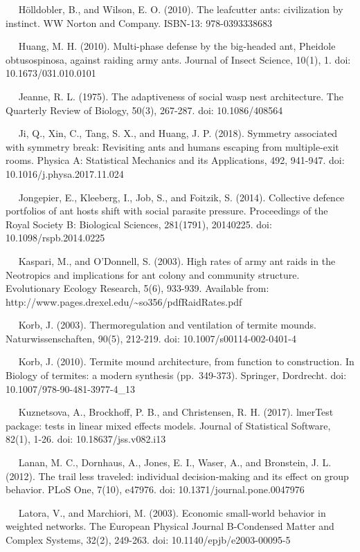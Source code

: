 \documentclass[3p]{elsarticle} %
\begin{document}
~~ Hölldobler, B., and Wilson, E. O. (2010). The leafcutter ants:
civilization by instinct. WW Norton and Company. ISBN-13: 978-0393338683

~~ Huang, M. H. (2010). Multi-phase defense by the big-headed ant,
Pheidole obtusospinosa, against raiding army ants. Journal of Insect
Science, 10(1), 1. doi: 10.1673/031.010.0101

~~ Jeanne, R. L. (1975). The adaptiveness of social wasp nest
architecture. The Quarterly Review of Biology, 50(3), 267-287. doi:
10.1086/408564

~~ Ji, Q., Xin, C., Tang, S. X., and Huang, J. P. (2018). Symmetry
associated with symmetry break: Revisiting ants and humans escaping from
multiple-exit rooms. Physica A: Statistical Mechanics and its
Applications, 492, 941-947. doi: 10.1016/j.physa.2017.11.024

~~ Jongepier, E., Kleeberg, I., Job, S., and Foitzik, S. (2014).
Collective defence portfolios of ant hosts shift with social parasite
pressure. Proceedings of the Royal Society B: Biological Sciences,
281(1791), 20140225. doi: 10.1098/rspb.2014.0225

~~ Kaspari, M., and O'Donnell, S. (2003). High rates of army ant raids
in the Neotropics and implications for ant colony and community
structure. Evolutionary Ecology Research, 5(6), 933-939. Available from:
http://www.pages.drexel.edu/\textasciitilde so356/pdfRaidRates.pdf

~~ Korb, J. (2003). Thermoregulation and ventilation of termite mounds.
Naturwissenschaften, 90(5), 212-219. doi: 10.1007/s00114-002-0401-4

~~ Korb, J. (2010). Termite mound architecture, from function to
construction. In Biology of termites: a modern synthesis (pp.~349-373).
Springer, Dordrecht. doi: 10.1007/978-90-481-3977-4\_13

~~ Kuznetsova, A., Brockhoff, P. B., and Christensen, R. H. (2017).
lmerTest package: tests in linear mixed effects models. Journal of
Statistical Software, 82(1), 1-26. doi: 10.18637/jss.v082.i13

~~ Lanan, M. C., Dornhaus, A., Jones, E. I., Waser, A., and Bronstein,
J. L. (2012). The trail less traveled: individual decision-making and
its effect on group behavior. PLoS One, 7(10), e47976. doi:
10.1371/journal.pone.0047976

~~ Latora, V., and Marchiori, M. (2003). Economic small-world behavior
in weighted networks. The European Physical Journal B-Condensed Matter
and Complex Systems, 32(2), 249-263. doi: 10.1140/epjb/e2003-00095-5
\end{document}
